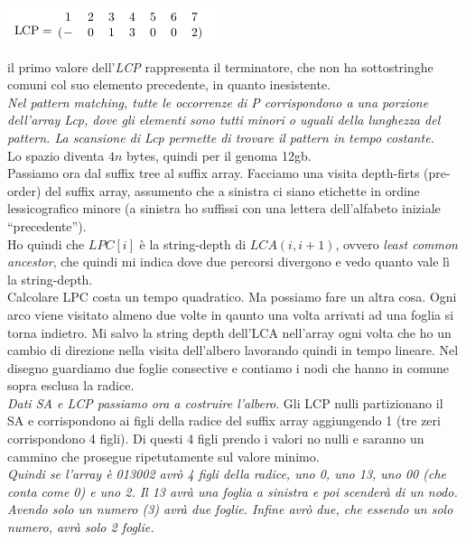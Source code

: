 \documentclass[a4paper,12pt, oneside]{book}
\begin{document}
\begin{center}
  \includegraphics[scale = 0.7]{img/sa2.png}
\end{center}
il primo valore dell'\textit{LCP} rappresenta il terminatore, che non
ha sottostringhe comuni col suo elemento precedente, in quanto
inesistente.\\
\textit{Nel pattern matching, tutte le occorrenze di P corrispondono a
  una porzione dell’array Lcp, dove 
  gli elementi sono tutti minori o uguali della lunghezza del
  pattern. La scansione di Lcp permette di 
  trovare il pattern in tempo costante.}\\
Lo spazio diventa $4n$ bytes, quindi per il genoma 12gb.\\
Passiamo ora dal suffix tree al suffix array. Facciamo una visita depth-firts
(pre-order) del suffix array, assumento che a sinistra ci siano
etichette in ordine lessicografico minore (a sinistra ho suffissi con
una lettera dell'alfabeto iniziale ``precedente'').\\
Ho quindi che $LPC[i]$ è la string-depth di $LCA(i, i+1)$, ovvero
\textit{least common ancestor}, che quindi mi indica dove due percorsi
divergono e vedo quanto vale lì la string-depth.\\
Calcolare LPC costa un tempo quadratico. Ma possiamo fare un altra
cosa. Ogni arco viene visitato almeno due volte in qaunto una volta arrivati
ad una foglia si torna indietro. Mi salvo la string depth dell'LCA
nell'array ogni volta che ho un cambio di direzione nella visita dell'albero
lavorando quindi in tempo lineare. Nel disegno guardiamo due foglie
consective e contiamo i nodi che hanno in comune sopra esclusa la radice.\\
\textit{Dati SA e LCP passiamo ora a costruire l'albero}. Gli LCP nulli
partizionano il SA e corrispondono ai figli della radice del suffix
array aggiungendo 1 (tre zeri corrispondono 4 figli). Di questi 4
figli prendo i valori no nulli e saranno un cammino che prosegue
ripetutamente sul valore minimo.\\
\textit{Quindi se l'array è 013002 avrò 4 figli della radice, uno 0, uno 13,
  uno 00 (che conta come 0) e uno 2. Il 13 avrà una foglia a sinistra e
  poi scenderà di un nodo. Avendo solo un numero (3) avrà due
  foglie. Infine avrò due, che essendo un solo numero, avrà solo 2
  foglie.}\\
\end{document}
